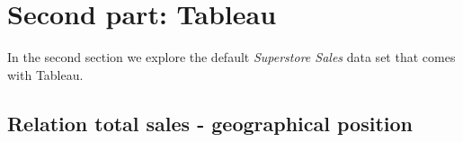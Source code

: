 \documentclass[openany]{article}
\begin{document}
\newpage
\section {Second part: Tableau}

In the second section we explore the default \textit{Superstore Sales} data set that comes with Tableau.

\subsection {Relation total sales - geographical position}
\end{document}
